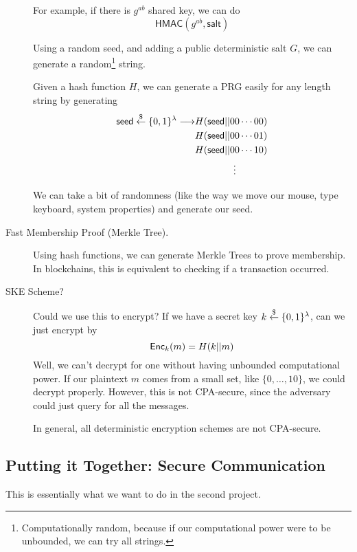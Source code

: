 \begin{description}
        For example, if there is $g^{ab}$ shared key, we can do
        \[\mathsf{HMAC}(g^{ab}, \textsf{salt})\]

        Using a random seed, and adding a public deterministic salt $G$, we can generate a random\footnote{Computationally random, because if our computational power were to be unbounded, we can try all strings.} string.


        Given a hash function $H$, we can generate a PRG easily for any length string by generating
        \begin{align*}
            \mathsf{seed}\overset{\$}{\leftarrow} \{0, 1\}^\lambda \longrightarrow & H(\mathsf{seed}||00\cdots 00) \\
                                                                       & H(\mathsf{seed}||00\cdots 01) \\
                                                                       & H(\mathsf{seed}||00\cdots 10) \\
                                                                       & \qquad\qquad \vdots
        \end{align*}

        We can take a bit of randomness (like the way we move our mouse, type keyboard, system properties) and generate our seed.

    \item[Fast Membership Proof (Merkle Tree).] Using hash functions, we can generate Merkle Trees to prove membership. In blockchains, this is equivalent to checking if a transaction occurred.

    \item[SKE Scheme?] Could we use this to encrypt? If we have a secret key $k\overset{\$}{\leftarrow}\{0, 1\}^\lambda$, can we just encrypt by
        \[\operatorname{\mathsf{Enc}}_k(m) = H(k||m)\]
        Well, we can't decrypt for one without having unbounded computational power. If our plaintext $m$ comes from a small set, like $\{0, \dots, 10\}$, we could decrypt properly. However, this is not CPA-secure, since the adversary could just query for all the messages.

        \begin{remark}
            In general, all deterministic encryption schemes are not CPA-secure.
        \end{remark}
\end{description}

\subsection{Putting it Together: Secure Communication}
This is essentially what we want to do in the second project.

